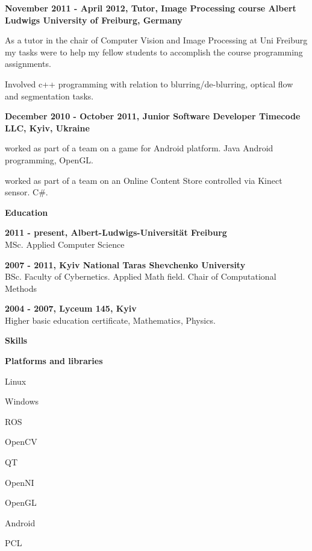 \documentclass[a4paper,12pt,final]{memoir}
\newcommand{\SmallSep}{\vspace{0.5em}}
\newcommand{\CVSection}[1]
	{\Large\textbf{#1}\par
	\SmallSep\normalsize\normalfont}
\newcommand{\CVItem}[1]
	{\textbf{\color{MidnightBlue} #1}}
\begin{document}
\CVItem{November 2011 - April 2012, Tutor, Image Processing course
\newline Albert Ludwigs University of Freiburg, Germany}
\begin{compactitem}[\color{RoyalBlue}$\circ$]
\item As a tutor in the chair of Computer Vision and Image Processing at Uni Freiburg my tasks were to help my fellow students to accomplish the course programming assignments.
\item Involved c++ programming with relation to blurring/de-blurring, optical flow and segmentation tasks.
\end{compactitem}
\SmallSep

\CVItem{December 2010 - October 2011, Junior Software Developer
\newline Timecode LLC, Kyiv, Ukraine}
\begin{compactitem}[\color{MidnightBlue}$\circ$]
\item worked as part of a team on a game for Android platform. Java Android programming, OpenGL.
\item worked as part of a team on an Online Content Store controlled via Kinect sensor. C\#.
\end{compactitem}
\SmallSep
\framebreak
\clearpage
\framebreak
\framebreak

\CVSection{Education}
\CVItem{2011 - present, Albert-Ludwigs-Universität Freiburg}\\
MSc. Applied Computer Science
\SmallSep

\CVItem{2007 - 2011, Kyiv National Taras Shevchenko University}\\
BSc. Faculty of Cybernetics. Applied Math field.
\newline Chair of Computational Methods
\SmallSep

\CVItem{2004 - 2007, Lyceum 145, Kyiv}\\
Higher basic education certificate, Mathematics, Physics.
\SmallSep

\CVSection{Skills}
\CVItem{Platforms and libraries}
\begin{multicols}{3}
\begin{compactitem}[\color{MidnightBlue}$\circ$]
	\item Linux
	\item Windows
	\item ROS
	\item OpenCV
	\item QT
	\item OpenNI
	\item OpenGL
	\item Android
	\item PCL
\end{compactitem}
\end{multicols}
\SmallSep
\end{document}
